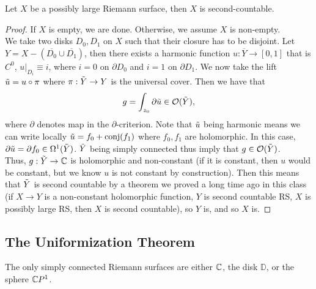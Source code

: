 \documentclass{article}
\begin{document}
{\begin{theorem}
    Let $X$ be a possibly large Riemann surface, then $X$ is second-countable.
\end{theorem}

\begin{proof}
    If $X$ is empty, we are done. Otherwise, we assume $X$ is non-empty.\\
    
    We take two disks $D_0, D_1$ on $X$ such that their closure has to be disjoint. Let $Y = X - (\overline{D_0} \cup \overline{D_1})$, then there exists a harmonic function $u: \overline{Y} \to [0,1]$ that is $C^0$, $u|_{D_i} \equiv i$, where $i = 0$ on $\partial D_0$ and $i = 1$ on $\partial D_1$. We now take the lift $\Tilde{u} = u \circ \pi$ where $\pi: \Tilde{Y} \to Y$ is the universal cover. Then we have that
    \[g = \int_{z_0} \partial \Tilde{u} \in \mathcal{O}(\Tilde{Y}),\]
    where $\partial$ denotes map in the $\partial$-criterion. Note that $\Tilde{u}$ being harmonic means we can write locally $\Tilde{u} = f_0 + \operatorname{conj}(f_1)$ where $f_0, f_1$ are holomorphic. In this case, $\partial \Tilde{u} = \partial f_0 \in \Omega^1(\Tilde{Y})$. $\Tilde{Y}$ being simply connected thus imply that $g \in \mathcal{O}(\Tilde{Y})$.\\

    Thus, $g: \Tilde{Y} \to \mathbb{C}$ is holomorphic and non-constant (if it is constant, then $u$ would be constant, but we know $u$ is not constant by construction). Then this means that $\Tilde{Y}$ is second countable by a theorem we proved a long time ago in this class (if $X \to Y$ is a non-constant holomorphic function, $Y$ is second countable RS, $X$ is possibly large RS, then $X$ is second countable), so $Y$ is, and so $X$ is.
\end{proof}

\subsection{The Uniformization Theorem}

\begin{theorem}
    The only simply connected Riemann surfaces are either $\mathbb{C}$, the disk $\mathbb{D}$, or the sphere $\mathbb{C} P^1$.
\end{theorem}

}
\end{document}
